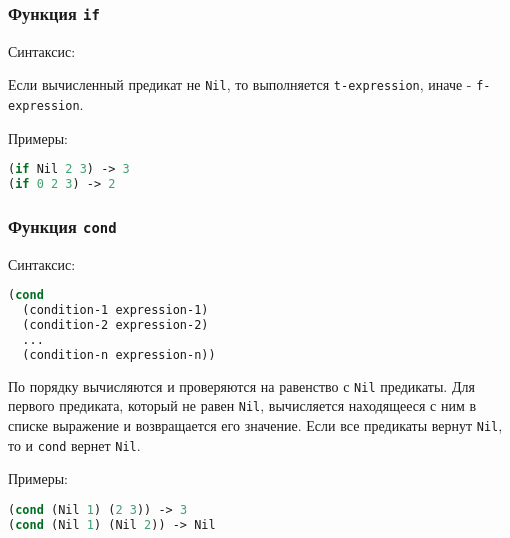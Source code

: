 \subsubsection*{Функция \texttt{if}}

Синтаксис: 

Если вычисленный предикат не \texttt{Nil}, то выполняется \texttt{t-expression}, иначе - \texttt{f-expression}.

Примеры:
\begin{lstlisting}[label=7xd, language=lisp]
(if Nil 2 3) -> 3
(if 0 2 3) -> 2
\end{lstlisting}

\subsubsection*{Функция \texttt{cond}}

Синтаксис:
\begin{lstlisting}[label=7xd, language=lisp]
(cond
  (condition-1 expression-1)
  (condition-2 expression-2)
  ...
  (condition-n expression-n))
\end{lstlisting}

По порядку вычисляются и проверяются на равенство с \texttt{Nil} предикаты. Для первого предиката, который не равен \texttt{Nil}, вычисляется находящееся с ним в списке выражение и возвращается его значение. Если все предикаты вернут \texttt{Nil}, то и \texttt{cond} вернет \texttt{Nil}.

Примеры:
\begin{lstlisting}[label=7xd, language=lisp]
(cond (Nil 1) (2 3)) -> 3
(cond (Nil 1) (Nil 2)) -> Nil
\end{lstlisting}
